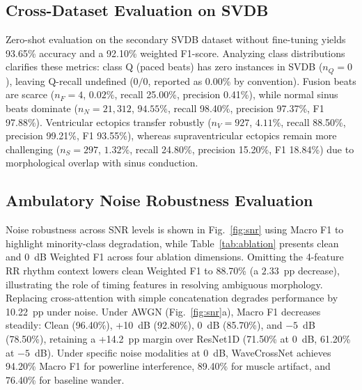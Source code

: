 \documentclass[conference]{IEEEtran}
\begin{document}
\subsection{Cross-Dataset Evaluation on SVDB}
Zero-shot evaluation on the secondary SVDB dataset without fine-tuning yields 93.65\% accuracy and a 92.10\% weighted F1-score. Analyzing class distributions clarifies these metrics: class Q (paced beats) has zero instances in SVDB ($n_Q = 0$), leaving Q-recall undefined ($0/0$, reported as 0.00\% by convention). Fusion beats are scarce ($n_F = 4$, $0.02\%$, recall 25.00\%, precision 0.41\%), while normal sinus beats dominate ($n_N = 21{,}312$, $94.55\%$, recall 98.40\%, precision 97.37\%, F1 97.88\%). Ventricular ectopics transfer robustly ($n_V = 927$, $4.11\%$, recall 88.50\%, precision 99.21\%, F1 93.55\%), whereas supraventricular ectopics remain more challenging ($n_S = 297$, $1.32\%$, recall 24.80\%, precision 15.20\%, F1 18.84\%) due to morphological overlap with sinus conduction.

\subsection{Ambulatory Noise Robustness Evaluation}
Noise robustness across SNR levels is shown in Fig.~\ref{fig:snr} using Macro F1 to highlight minority-class degradation, while Table~\ref{tab:ablation} presents clean and 0~dB Weighted F1 across four ablation dimensions. Omitting the 4-feature RR rhythm context lowers clean Weighted F1 to 88.70\% (a $2.33$~pp decrease), illustrating the role of timing features in resolving ambiguous morphology. Replacing cross-attention with simple concatenation degrades performance by 10.22~pp under noise. Under AWGN (Fig.~\ref{fig:snr}a), Macro F1 decreases steadily: Clean (96.40\%), +10~dB (92.80\%), 0~dB (85.70\%), and $-5$~dB (78.50\%), retaining a +14.2~pp margin over ResNet1D (71.50\% at 0~dB, 61.20\% at $-5$~dB). Under specific noise modalities at 0~dB, WaveCrossNet achieves 94.20\% Macro F1 for powerline interference, 89.40\% for muscle artifact, and 76.40\% for baseline wander.
\end{document}

